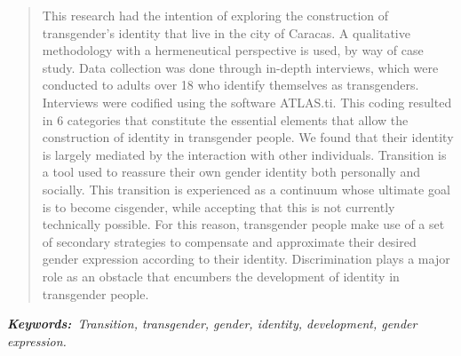 \begin{quote}
This research had the intention of exploring the construction of
transgender's identity that live in the city of Caracas. A qualitative
methodology with a hermeneutical perspective is used, by way of case
study. Data collection was done through in-depth interviews, which were
conducted to adults over 18 who identify themselves as
transgenders. Interviews were codified using the software ATLAS.ti\@. This
coding resulted in 6 categories that constitute the essential elements that
allow the construction of identity in transgender people. We found that their
identity is largely mediated by the interaction with other individuals.
Transition is a tool used to reassure their own gender identity both
personally and socially. This transition is experienced as a continuum whose
ultimate goal is to become cisgender, while accepting that this is not
currently technically possible. For this reason, transgender people make use
of a set of secondary strategies to compensate and approximate their desired
gender expression according to their identity. Discrimination plays a major
role as an obstacle that encumbers the development of identity in transgender
people.
\end{quote}

\itshape\textbf{Keywords:}\normalfont{}\ Transition, transgender,
gender, identity,  development, gender expression.
